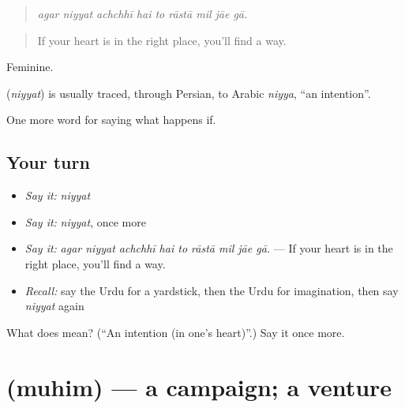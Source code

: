 \begin{quote}
        
\end{quote}

\begin{quote}
\emph{agar niyyat achchhī hai to rāstā mil jāe gā.}
\end{quote}

\begin{quote}
If your heart is in the right place, you'll find a way.
\end{quote}

Feminine.

\begin{cousinweb}
\textbf{} (\emph{niyyat}) is usually traced, through Persian, to Arabic \emph{niyya}, \textquotedblleft{}an intention\textquotedblright{}.
\end{cousinweb}

\begin{grammarlens}[title={What you've built}]
One more word for saying what happens if.
\end{grammarlens}

\subsection*{Your turn}
\begin{itemize}
\raggedright
  \item \emph{Say it:} \emph{niyyat}
  \item \emph{Say it:} \emph{niyyat}, once more
  \item \emph{Say it:} \emph{agar niyyat achchhī hai to rāstā mil jāe gā.} — If your heart is in the right place, you'll find a way.
  \item \emph{Recall:} say the Urdu for a yardstick, then the Urdu for imagination, then say \emph{niyyat} again
\end{itemize}

\begin{tcolorbox}[breakable,colback=teal!4,colframe=teal!35!black,title={Before you move on}]
What does  mean? (\textquotedblleft{}An intention (in one's heart)\textquotedblright{}.) Say it once more.
\end{tcolorbox}
\section[\texorpdfstring{\ur{مہم} (muhim)}{مہم (muhim)}]{ (muhim) — a campaign; a venture}

